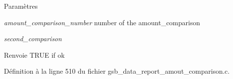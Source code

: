 \begin{DoxyParams}{Paramètres}
\item[{\em amount\_\-comparison\_\-number}]number of the amount\_\-comparison \item[{\em second\_\-comparison}]\end{DoxyParams}
\begin{DoxyReturn}{Renvoie}
TRUE if ok 
\end{DoxyReturn}


Définition à la ligne 510 du fichier gsb\_\-data\_\-report\_\-amout\_\-comparison.c.

